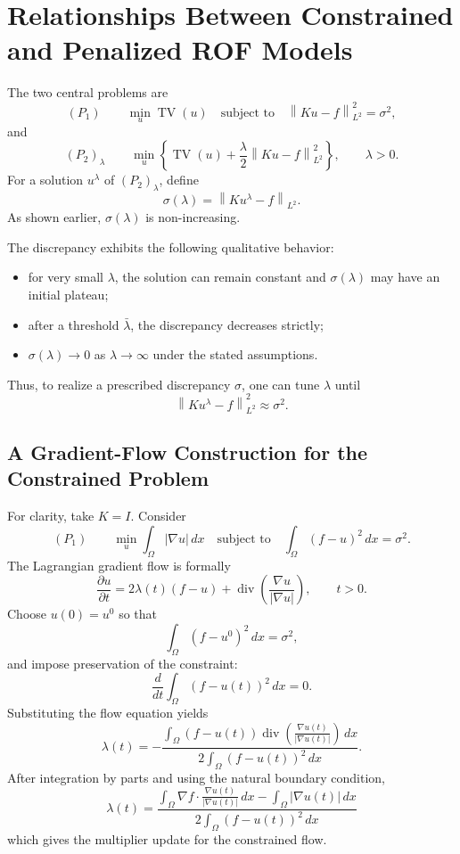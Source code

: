 \documentclass[11pt]{article}
\newcommand{\Om}{\Omega}
\newcommand{\TV}{\operatorname{TV}}
\newcommand{\Div}{\operatorname{div}}
\newcommand{\norm}[2][]{\left\lVert #2\right\rVert_{#1}}
\theoremstyle{definition}
\theoremstyle{plain}
\begin{document}
\begin{center}
\end{center}

\section{Relationships Between Constrained and Penalized ROF Models}

The two central problems are
\[
(P_1)\qquad
\min_u \TV(u)
\quad\text{subject to}\quad
\norm[L^2]{Ku-f}^2=\sigma^2,
\]
and
\[
(P_2)_\lambda\qquad
\min_u\left\{
\TV(u)+\frac{\lambda}{2}\norm[L^2]{Ku-f}^2
\right\},
\qquad \lambda>0.
\]
For a solution $u^\lambda$ of $(P_2)_\lambda$, define
\[
\sigma(\lambda)=\norm[L^2]{Ku^\lambda-f}.
\]
As shown earlier, $\sigma(\lambda)$ is non-increasing.

The discrepancy exhibits the following qualitative behavior:
\begin{itemize}
\item for very small $\lambda$, the solution can remain constant and $\sigma(\lambda)$ may have an initial plateau;
\item after a threshold $\bar\lambda$, the discrepancy decreases strictly;
\item $\sigma(\lambda)\to0$ as $\lambda\to\infty$ under the stated assumptions.
\end{itemize}
Thus, to realize a prescribed discrepancy $\sigma$, one can tune $\lambda$ until
\[
\norm[L^2]{Ku^\lambda-f}^2\approx\sigma^2.
\]

\subsection{A Gradient-Flow Construction for the Constrained Problem}
For clarity, take $K=I$. Consider
\[
(P_1)\qquad
\min_u\int_{\Om}|\nabla u|\,dx
\quad\text{subject to}\quad
\int_{\Om}(f-u)^2\,dx=\sigma^2.
\]
The Lagrangian gradient flow is formally
\[
\frac{\partial u}{\partial t}
=2\lambda(t)(f-u)
+\Div\left(\frac{\nabla u}{|\nabla u|}\right),
\qquad t>0.
\]
Choose $u(0)=u^0$ so that
\[
\int_{\Om}(f-u^0)^2\,dx=\sigma^2,
\]
and impose preservation of the constraint:
\[
\frac{d}{dt}\int_{\Om}(f-u(t))^2\,dx=0.
\]
Substituting the flow equation yields
\[
\lambda(t)
=-\frac{
\displaystyle\int_{\Om}(f-u(t))
\Div\left(\frac{\nabla u(t)}{|\nabla u(t)|}\right)\,dx
}{
\displaystyle 2\int_{\Om}(f-u(t))^2\,dx
}.
\]
After integration by parts and using the natural boundary condition,
\[
\lambda(t)=
\frac{
\displaystyle\int_{\Om}\nabla f\cdot\frac{\nabla u(t)}{|\nabla u(t)|}\,dx
-\displaystyle\int_{\Om}|\nabla u(t)|\,dx
}{
\displaystyle 2\int_{\Om}(f-u(t))^2\,dx
}
\]
which gives the multiplier update for the constrained flow.
\end{document}
